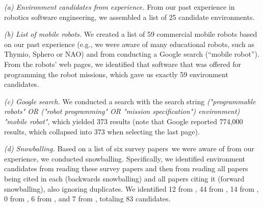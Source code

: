 \emph{(a) Environment candidates from experience.} From our past experience in robotics software engineering, we assembled a list of 25 candidate environments.

\emph{(b) List of mobile robots.} We created a list of 59 commercial mobile robots based on our past experience (e.g., we were aware of many educational robots, such as Thymio, Sphero or NAO) and from conducting a Google search (``mobile robot'').
From the robots' web pages, we identified that software that was offered for programming the robot missions, which gave us exactly 59 environment candidates.

\emph{(c) Google search.} We conducted a search with the search string \emph{("programmable robots" OR ("robot programming" OR "mission specification") environment) "mobile robot"}, which yielded 373 results (note that Google reported 774,000 results, which collapsed into 373 when selecting the last page).

\emph{(d) Snowballing.} Based on a list of six survey papers\,\cite{Biggs2003,Bravo2018,Jost2015,Luckcuck2018,Nordmann2016a,Hentout2017} we were aware of from our experience, we conducted snowballing. Specifically, we identified environment candidates from reading these survey papers and then from reading all papers being cited in each (backwards snowballing) and all papers citing it (forward snowballing), also ignoring duplicates. We identified 12 from \citet{Biggs2003}, 44 from \citet{Bravo2018}, 14 from \citet{Jost2015}, 0 from \citet{Luckcuck2018}, 6 from \citet{Nordmann2016a}, and 7 from \citet{Hentout2017}, totaling 83 candidates.

